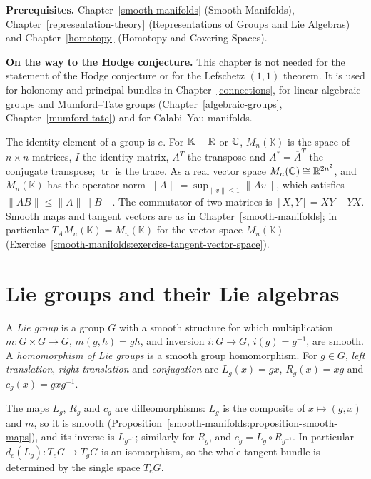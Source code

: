 \noindent\textbf{Prerequisites.} Chapter~\ref{smooth-manifolds} (Smooth Manifolds), Chapter~\ref{representation-theory} (Representations of Groups and Lie Algebras) and
Chapter~\ref{homotopy} (Homotopy and Covering Spaces).

\noindent\textbf{On the way to the Hodge conjecture.} This chapter is not needed for the statement of the Hodge conjecture or for the Lefschetz $(1,1)$ theorem. It is used for holonomy and principal
bundles in Chapter~\ref{connections}, for linear algebraic groups and Mumford--Tate groups (Chapter~\ref{algebraic-groups}, Chapter~\ref{mumford-tate}) and for Calabi--Yau manifolds.

\begin{notation}\label{lie-groups:notation-matrices}
The identity element of a group is $e$. For $\mathbb{K} = \mathbb{R}$ or $\mathbb{C}$, $M_n(\mathbb{K})$ is the space of $n \times n$ matrices, $I$ the identity matrix, $A^T$
the transpose and $A^* = \overline{A}^T$ the conjugate transpose; $\operatorname{tr}$ is the trace. As a real vector space $M_n(\mathbb{C}) \cong \mathbb{R}^{2n^2}$, and
$M_n(\mathbb{K})$ has the operator norm $\|A\| = \sup_{\|v\| \leq 1}\|Av\|$, which satisfies $\|AB\| \leq \|A\|\|B\|$. The commutator of two matrices is
$[X, Y] = XY - YX$. Smooth maps and tangent vectors are as in Chapter~\ref{smooth-manifolds}; in particular $T_A M_n(\mathbb{K}) = M_n(\mathbb{K})$ for the
vector space $M_n(\mathbb{K})$ (Exercise~\ref{smooth-manifolds:exercise-tangent-vector-space}).
\end{notation}

\section{Lie groups and their Lie algebras}\label{lie-groups:section-lie-algebras}

\begin{definition}\label{lie-groups:definition-lie-group}
A \emph{Lie group} is a group $G$ with a smooth structure for which multiplication $m \colon G \times G \to G$, $m(g, h) = gh$, and inversion
$i \colon G \to G$, $i(g) = g^{-1}$, are smooth. A \emph{homomorphism of Lie groups} is a smooth group homomorphism. For $g \in G$, \emph{left translation},
\emph{right translation} and \emph{conjugation} are $L_g(x) = gx$, $R_g(x) = xg$ and $c_g(x) = gxg^{-1}$.
\end{definition}

The maps $L_g$, $R_g$ and $c_g$ are diffeomorphisms: $L_g$ is the composite of $x \mapsto (g, x)$ and $m$, so it is smooth
(Proposition~\ref{smooth-manifolds:proposition-smooth-maps}), and its inverse is $L_{g^{-1}}$; similarly for $R_g$, and $c_g = L_g \circ R_{g^{-1}}$. In
particular $d_e(L_g) \colon T_eG \to T_gG$ is an isomorphism, so the whole tangent bundle is determined by the single space $T_eG$.

